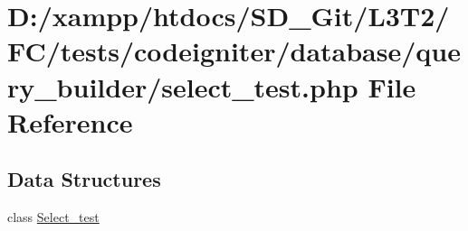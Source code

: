 \hypertarget{tests_2codeigniter_2database_2query__builder_2select__test_8php}{}\section{D\+:/xampp/htdocs/\+S\+D\+\_\+\+Git/\+L3\+T2/\+F\+C/tests/codeigniter/database/query\+\_\+builder/select\+\_\+test.php File Reference}
\label{tests_2codeigniter_2database_2query__builder_2select__test_8php}
\subsection*{Data Structures}
\begin{DoxyCompactItemize}
\item 
class \hyperlink{class_select__test}{Select\+\_\+test}
\end{DoxyCompactItemize}
